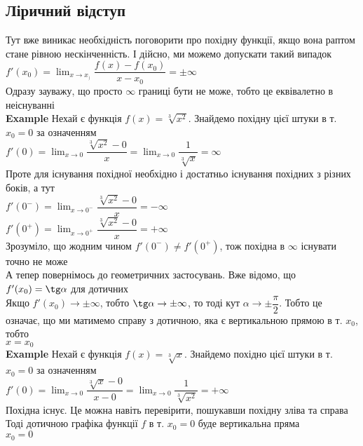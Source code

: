 \documentclass[a4paper, 14pt]{extarticle}
\def\huge{\displaystyle}
\def\bigline{\vspace{5mm}\\}
\def\ex#1{\textbf{Example {#1}}}
\def\bigline{\vspace{5mm}\\}
\begin{document}
\subsection*{Ліричний відступ}
Тут вже виникає необхідність поговорити про похідну функції, якщо вона раптом стане рівною нескінченність. І дійсно, ми можемо допускати такий випадок\\
$f'(x_0) = \huge \lim_{x \to x_)} \dfrac{f(x)-f(x_0)}{x-x_0} = \pm \infty$\\
Одразу зауважу, що просто $\infty$ границі бути не може, тобто це еквівалетно в неіснуванні
\bigline
\ex{} Нехай є функція $f(x) = \sqrt[3]{x^2}$. Знайдемо похідну цієї штуки в т. $x_0 = 0$ за означенням\\
$f'(0) = \huge \lim_{x \to 0} \dfrac{\sqrt[3]{x^2} - 0}{x} = \lim_{x \to 0} \dfrac{1}{\sqrt[3]{x}} = \infty$\\
Проте для існування похідної необхідно і достатньо існування похідних з різних боків, а тут\\
$f'(0^-) = \huge \lim_{x \to 0^-} \dfrac{\sqrt[3]{x^2} - 0}{x} = -\infty$\\
$f'(0^+) = \huge \lim_{x \to 0^+} \dfrac{\sqrt[3]{x^2} - 0}{x} = +\infty$\\
Зрозуміло, що жодним чином $f'(0^-) \neq f'(0^+)$, тож похідна в $\infty$ існувати точно не може
\bigline
А тепер повернімось до геометричних застосувань. Вже відомо, що $f'(x_0) = \tg \alpha$ для дотичних\\
Якщо $f'(x_0) \to \pm \infty$, тобто $\tg \alpha \to \pm \infty$, то тоді кут $\alpha \to \pm \dfrac{\pi}{2}$. Тобто це означає, що ми матимемо справу з дотичною, яка є вертикальною прямою в т. $x_0$, тобто\\
$x=x_0$
\bigline
\ex{} Нехай є функція $f(x) = \sqrt[3]{x}$. Знайдемо похідно цієї штуки в т. $x_0 = 0$ за означенням\\
$f'(0) = \huge \lim_{x \to 0} \dfrac{\sqrt[3]{x}-0}{x-0} = \lim_{x \to 0} \dfrac{1}{\sqrt[3]{x^2}} = + \infty$\\
Похідна існує. Це можна навіть перевірити, пошукавши похідну зліва та справа\\
Тоді дотичною графіка функції $f$ в т. $x_0 = 0$ буде вертикальна пряма\\
$x_0 = 0$\\
\begin{figure}[H]
\centering
{
}
\end{figure}
\end{document}
